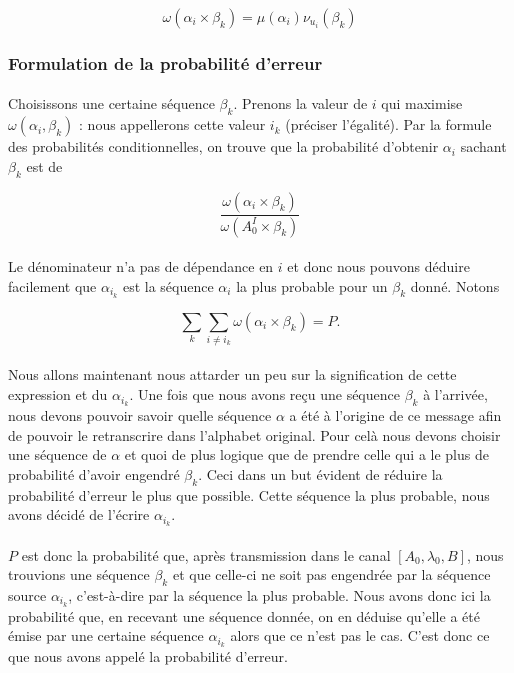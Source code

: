 	\[\omega(\alpha_i\times\beta_k)=\mu(\alpha_i)\nu_{u_i}(\beta_k)\]
	
\subsubsection*{Formulation de la probabilité d'erreur}
	
	\paragraph{}
	Choisissons une certaine séquence $\beta_k$.
	Prenons la valeur de $i$ qui maximise $\omega(\alpha_i,\beta_k)$ : nous appellerons cette valeur $i_k$ (préciser l'égalité).
	Par la formule des probabilités conditionnelles, on trouve que la probabilité d'obtenir $\alpha_i$ sachant $\beta_k$ est de 
	
	\[\frac{\omega(\alpha_i \times \beta_k)}{\omega(A_0^I \times \beta_k)}\]
	
	\paragraph{}
	Le dénominateur n'a pas de dépendance en $i$ et donc nous pouvons déduire facilement que $\alpha_{i_k}$ est la séquence $\alpha_i$ la plus probable pour un $\beta_k$ donné.
	Notons
	
	\[\sum_k\sum_{i\neq i_k}\omega(\alpha_i \times \beta_k) = P.\]
	
	\paragraph{}
	Nous allons maintenant nous attarder un peu sur la signification de cette expression et du $\alpha_{i_k}$. Une fois que nous
	avons reçu une séquence $\beta_k$ à l'arrivée, nous devons pouvoir savoir quelle séquence $\alpha$ a été à l'origine de ce message
	afin de pouvoir le retranscrire dans l'alphabet original. Pour celà nous devons choisir une séquence de $\alpha$ et quoi de plus 
	logique que de prendre celle qui a le plus de probabilité d'avoir engendré $\beta_k$. Ceci dans un but évident de réduire la probabilité
	d'erreur le plus que possible. Cette séquence la plus probable, nous avons décidé de l'écrire $\alpha_{i_k}$.
	
	\paragraph{}
	$P$ est donc la probabilité que, après transmission dans le canal $[A_0,\lambda_0,B]$, nous trouvions une séquence $\beta_k$ et que celle-ci ne soit pas engendrée par 
	la séquence source $\alpha_{i_k}$, c'est-à-dire par la séquence la plus probable. Nous avons donc ici la probabilité que, en recevant une séquence donnée, on en déduise
	qu'elle a été émise par une certaine séquence $\alpha_{i_k}$ alors que ce n'est pas le cas. C'est donc ce que nous avons appelé la probabilité
	d'erreur.
	

